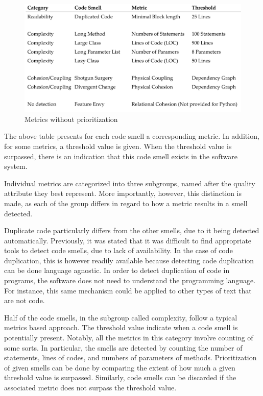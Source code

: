 \begin{figure}[htp]
    \centering
    \includegraphics[width=\textwidth]{./assets/smell_overview}
    \caption{Metrics without prioritization}
\end{figure}
The above table presents for each code smell a corresponding metric. In addition, for some metrics, a threshold value is given. When the threshold value is surpassed, there is an indication that this code smell exists in the software system.

Individual metrics are categorized into three subgroups, named after the quality attribute they best represent. More importantly, however, this distinction is made, as each of the group differs in regard to how a metric results in a smell detected. 

Duplicate code particularly differs from the other smells, due to it being detected automatically. Previously, it was stated that it was difficult to find appropriate tools to detect code smells, due to lack of availability.
In the case of code duplication, this is however readily available because detecting code duplication can be done language agnostic. In order to detect duplication of code in programs, the software does not need to understand the programming language. For instance, this same mechanism could be applied to other types of text that are not code.

Half of the code smells, in the subgroup called complexity, follow a typical metrics based approach. The threshold value indicate when a code smell is potentially present. Notably, all the metrics in this category involve counting of some sorts. In particular, the smells are detected by counting the number of statements, lines of codes, and numbers of parameters of methods. Prioritization of given smells can be done by comparing the extent of how much a given threshold value is surpassed. Similarly, code smells can be discarded if the associated metric does not surpass the threshold value. 


